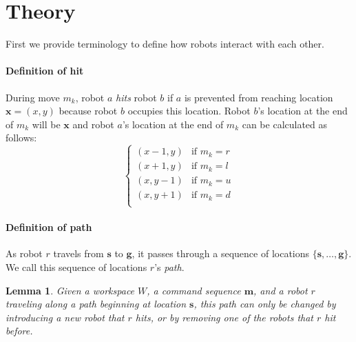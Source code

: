 \documentclass[letterpaper, 10 pt, conference]{ieeeconf}
\newtheorem{lemma}[theorem]{Lemma}
\begin{document}
\section{Theory}\label{sec:theory}

First we provide terminology to define how robots interact with each other. 


\paragraph{Definition of hit}
During move $m_k$, robot $a$ \emph{hits} robot $b$ if $a$ is prevented from reaching location $\bm{x}=(x,y)$ because robot $b$ occupies this location. Robot $b$'s location at the end of $m_k$ will be $\bm{x}$ and robot $a$'s location at the end of $m_k$ can be calculated as follows:
\begin{displaymath}
    \left\{
     \begin{array}{ll}
       (x-1,y) &\text{if }m_k=r\\
       (x+1,y) &\text{if }m_k=l\\
       (x,y-1) &\text{if }m_k=u\\
       (x,y+1) &\text{if }m_k=d\\
     \end{array}
   \right.
\end{displaymath} 

\paragraph{Definition of path}
As robot $r$ travels from $\bm{s}$ to $\bm{g}$, it passes through a sequence of locations $\{\bm{s},\ldots,\bm{g}\}$.  We call this sequence of locations $r$'s \emph{path}. 

\begin{lemma}\label{lemma:changeInHitsNeededToChangePath}
Given a workspace $W$, a command sequence $\bm{m}$, and a robot $r$ traveling along a path beginning at location $\bm{s}$, this path can only be changed by introducing a new robot that $r$ hits, or by removing one of the robots that $r$ hit before.
\end{lemma}
\end{document}
